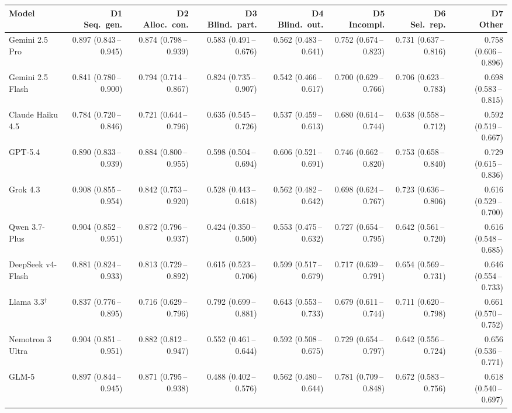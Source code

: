 \begin{tabular}{lrrrrrrr}
\toprule
Model & \makecell{D1\\Seq.\ gen.} & \makecell{D2\\Alloc.\ con.} & \makecell{D3\\Blind.\ part.} & \makecell{D4\\Blind.\ out.} & \makecell{D5\\Incompl.} & \makecell{D6\\Sel.\ rep.} & \makecell{D7\\Other} \\
\midrule
Gemini 2.5 Pro & 0.897 (0.843\,--\,0.945) & 0.874 (0.798\,--\,0.939) & 0.583 (0.491\,--\,0.676) & 0.562 (0.483\,--\,0.641) & 0.752 (0.674\,--\,0.823) & 0.731 (0.637\,--\,0.816) & 0.758 (0.606\,--\,0.896) \\
Gemini 2.5 Flash & 0.841 (0.780\,--\,0.900) & 0.794 (0.714\,--\,0.867) & 0.824 (0.735\,--\,0.907) & 0.542 (0.466\,--\,0.617) & 0.700 (0.629\,--\,0.766) & 0.706 (0.623\,--\,0.783) & 0.698 (0.583\,--\,0.815) \\
Claude Haiku 4.5 & 0.784 (0.720\,--\,0.846) & 0.721 (0.644\,--\,0.796) & 0.635 (0.545\,--\,0.726) & 0.537 (0.459\,--\,0.613) & 0.680 (0.614\,--\,0.744) & 0.638 (0.558\,--\,0.712) & 0.592 (0.519\,--\,0.667) \\
GPT-5.4 & 0.890 (0.833\,--\,0.939) & 0.884 (0.800\,--\,0.955) & 0.598 (0.504\,--\,0.694) & 0.606 (0.521\,--\,0.691) & 0.746 (0.662\,--\,0.820) & 0.753 (0.658\,--\,0.840) & 0.729 (0.615\,--\,0.836) \\
Grok 4.3 & 0.908 (0.855\,--\,0.954) & 0.842 (0.753\,--\,0.920) & 0.528 (0.443\,--\,0.618) & 0.562 (0.482\,--\,0.642) & 0.698 (0.624\,--\,0.767) & 0.723 (0.636\,--\,0.806) & 0.616 (0.529\,--\,0.700) \\
Qwen 3.7-Plus & 0.904 (0.852\,--\,0.951) & 0.872 (0.796\,--\,0.937) & 0.424 (0.350\,--\,0.500) & 0.553 (0.475\,--\,0.632) & 0.727 (0.654\,--\,0.795) & 0.642 (0.561\,--\,0.720) & 0.616 (0.548\,--\,0.685) \\
DeepSeek v4-Flash & 0.881 (0.824\,--\,0.933) & 0.813 (0.729\,--\,0.892) & 0.615 (0.523\,--\,0.706) & 0.599 (0.517\,--\,0.679) & 0.717 (0.639\,--\,0.791) & 0.654 (0.569\,--\,0.731) & 0.646 (0.554\,--\,0.733) \\
Llama 3.3$^\dagger$ & 0.837 (0.776\,--\,0.895) & 0.716 (0.629\,--\,0.796) & 0.792 (0.699\,--\,0.881) & 0.643 (0.553\,--\,0.733) & 0.679 (0.611\,--\,0.744) & 0.711 (0.620\,--\,0.798) & 0.661 (0.570\,--\,0.752) \\
Nemotron 3 Ultra & 0.904 (0.851\,--\,0.951) & 0.882 (0.812\,--\,0.947) & 0.552 (0.461\,--\,0.644) & 0.592 (0.508\,--\,0.675) & 0.729 (0.654\,--\,0.797) & 0.642 (0.556\,--\,0.724) & 0.656 (0.536\,--\,0.771) \\
GLM-5 & 0.897 (0.844\,--\,0.945) & 0.871 (0.795\,--\,0.938) & 0.488 (0.402\,--\,0.576) & 0.562 (0.480\,--\,0.644) & 0.781 (0.709\,--\,0.848) & 0.672 (0.583\,--\,0.756) & 0.618 (0.540\,--\,0.697) \\
\bottomrule
\end{tabular}